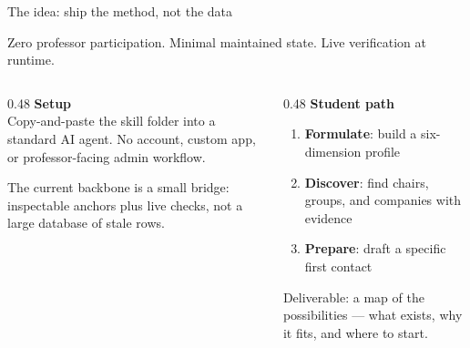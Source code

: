 \documentclass[11pt,aspectratio=169]{beamer}
\begin{document}
\begin{frame}{The idea: ship the method, not the data}
  \small
  \begin{center}
    \alert{Zero professor participation. Minimal maintained state. Live verification at runtime.}
  \end{center}
  \vspace{0.3em}
  \begin{columns}[T]
    \begin{column}{0.48\textwidth}
      \textbf{Setup}\\[0.3em]
      Copy-and-paste the skill folder into a standard AI agent. No account,
      custom app, or professor-facing admin workflow.

      \medskip
      The current backbone is a small bridge: inspectable anchors plus live checks,
      not a large database of stale rows.
    \end{column}
    \begin{column}{0.48\textwidth}
      \textbf{Student path}\\[0.3em]
      \begin{enumerate}
        \item \textbf{Formulate}: build a six-dimension profile
        \item \textbf{Discover}: find chairs, groups, and companies with evidence
        \item \textbf{Prepare}: draft a specific first contact
      \end{enumerate}
      \medskip
      Deliverable: a \alert{map of the possibilities} --- what exists, why it fits,
      and where to start.
    \end{column}
  \end{columns}
\end{frame}
\end{document}
